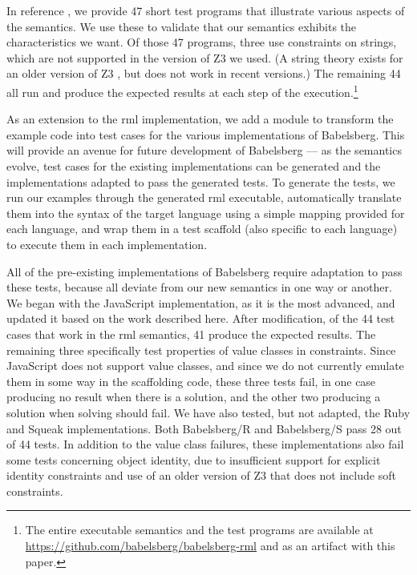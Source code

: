 \documentclass[10pt,reprint]{sigplanconf-preprint}
\def\tf#1{\todo[size=\footnotesize,color=purple!40]{\textsf{TF: #1}}}
\newcommand{\ac}[1]{\gls*{#1}}
\newcommand{\javascript}{JavaScript\xspace}
\newcommand{\rml}{\ac{rml}\xspace}
\begin{document}
In reference \cite{felgentreff:2015:semantics}, we provide 47 short 
test programs that illustrate various aspects of
the semantics. We use these to validate that our semantics exhibits
the characteristics we want. Of those 47 programs, three use
constraints on strings, which are not supported in the version of Z3
we used.  (A string theory exists for an older version of Z3
\cite{zheng2013z3}, but does not work in recent versions.)  The
remaining 44 all run and produce the expected results at each step of
the execution.\footnote{The entire executable semantics and the test
  programs are available at
  \url{https://github.com/babelsberg/babelsberg-rml} and
  as an artifact with this paper.}

As an extension to the \rml implementation, we add a module to
transform the example code into test cases for the various
implementations of Babelsberg. This will provide an avenue for future
development of Babelsberg --- as the semantics evolve, test cases for
the existing implementations can be generated and the implementations
adapted to pass the generated tests. To generate the tests, we run our
examples through the generated \rml executable, automatically
translate them into the syntax of the target language using a simple
mapping provided for each language, and wrap them in a test scaffold
(also specific to each language) to execute them in each
implementation.%

All of the pre-existing implementations of Babelsberg require
adaptation to pass these tests, because all deviate from our new
semantics in one way or another.  We began with the \javascript
implementation, as it is the most advanced, and updated it based on
the work described here.  After modification, of the 44 test cases
that work in the \rml semantics, 41 produce the expected results. The
remaining three specifically test properties of value classes in
constraints.  Since \javascript does not support value classes, and
since we do not currently emulate them in some way in the scaffolding code,
these three tests fail, in one case producing no result when there is
a solution, and the other two producing a solution when solving should
fail.  We have also tested, but not adapted, the Ruby and Squeak
implementations. Both Babelsberg/R and Babelsberg/S pass 28 out of 44
tests. In addition to the value class failures, these implementations
also fail some tests concerning object identity, due to insufficient
support for explicit identity constraints and use of an older
version of Z3 that does not include soft constraints.
\end{document}
